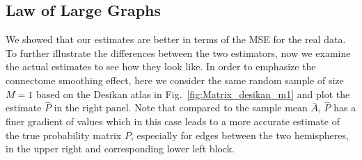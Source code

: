 \documentclass[simplex.tex]{subfiles}
\begin{document}
\subsection{Law of Large Graphs}
We showed that our estimates are better in terms of the MSE for the real data. To further illustrate the differences between the two estimators, now we examine the actual estimates to see how they look like. In order to emphasize the connectome smoothing effect, here we consider the same random sample of size $M=1$ based on the Desikan atlas in Fig.~\ref{fig:Matrix_desikan_m1} and plot the estimate $\hat{P}$ in the right panel. Note that compared to the sample mean $\bar{A}$, $\hat{P}$ has a finer gradient of values which in this case leads to a more accurate estimate of the true probability matrix $P$, especially for edges between the two hemispheres, in the upper right and corresponding lower left block.
\end{document}

